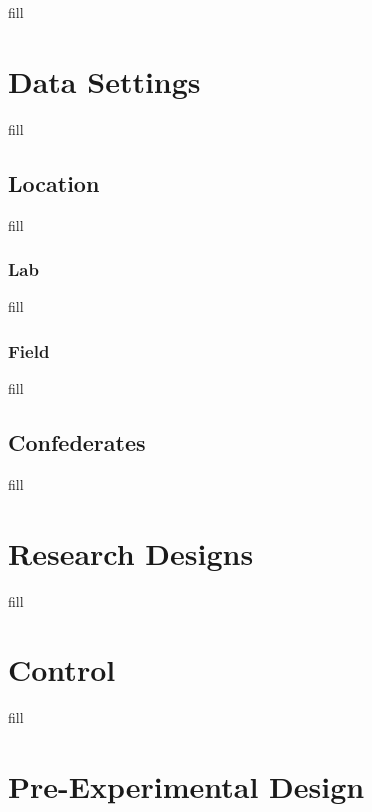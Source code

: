 \documentclass[
  b5paper]{book}
\begin{document}
fill

\hypertarget{data-settings}{%
\section{Data Settings}\label{data-settings}}

fill

\hypertarget{location}{%
\subsection*{Location}\label{location}}

fill

\hypertarget{lab}{%
\subsubsection*{Lab}\label{lab}}

fill

\hypertarget{field}{%
\subsubsection*{Field}\label{field}}

fill

\hypertarget{confederates}{%
\subsection*{Confederates}\label{confederates}}

fill

\hypertarget{research-designs}{%
\section{Research Designs}\label{research-designs}}

fill

\hypertarget{control}{%
\section{Control}\label{control}}

fill

\hypertarget{pre-experimental-design}{%
\section{Pre-Experimental Design}\label{pre-experimental-design}}
\end{document}

